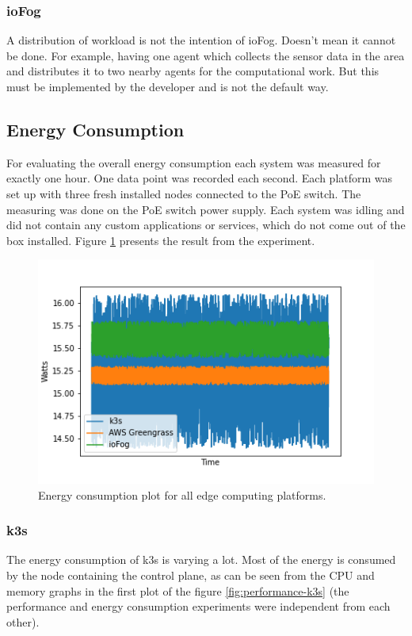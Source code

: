 \subsubsection*{ioFog}
A distribution of workload is not the intention of ioFog. Doesn't mean it cannot be done. For example, having one agent which collects the sensor data in the area and distributes it to two nearby agents for the computational work. But this must be implemented by the developer and is not the default way.
\subsection*{Energy Consumption}
For evaluating the overall energy consumption each system was measured for exactly one hour. One data point was recorded each second. Each platform was set up with three fresh installed nodes connected to the \gls{PoE} switch. The measuring was done on the \gls{PoE} switch power supply. Each system was idling and did not contain any custom applications or services, which do not come out of the box installed. Figure \ref{fig:energy-consumption-plot} presents the result from the experiment.

\begin{figure}[H]
    \centering
    \includegraphics[width=\textwidth]{assets/evaluation/plots/energy-consumption.png}
    \caption{Energy consumption plot for all edge computing platforms.}\label{fig:energy-consumption-plot}
\end{figure}

\subsubsection*{k3s}
The energy consumption of k3s is varying a lot. Most of the energy is consumed by the node containing the control plane, as can be seen from the CPU and memory graphs in the first plot of the figure \ref{fig:performance-k3s} (the performance and energy consumption experiments were independent from each other).

